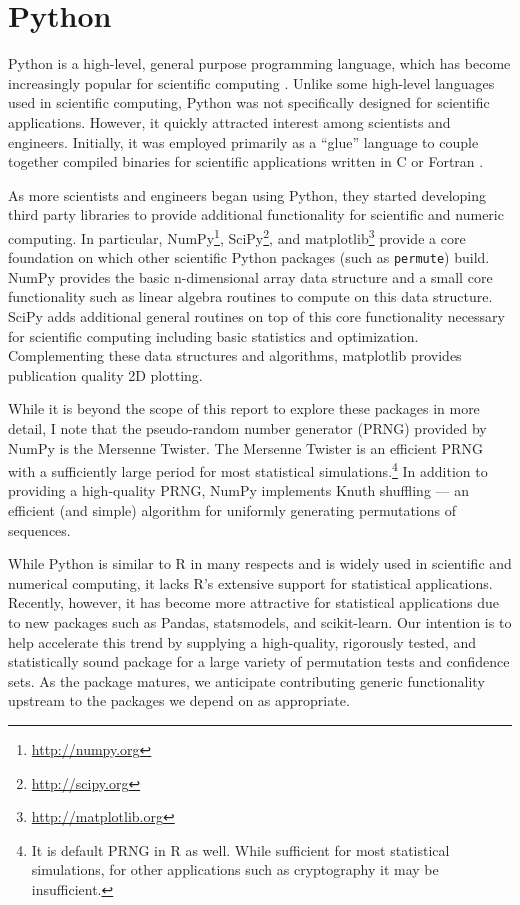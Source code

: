\section{Python}

Python is a high-level, general purpose programming language, which has become
increasingly popular for scientific computing \cite{millman2011python,
Perez2011}. Unlike some high-level languages used in scientific computing,
Python was not specifically designed for scientific applications.  However, it
quickly attracted interest among scientists and engineers.  Initially, it was
employed primarily as a ``glue'' language to couple together compiled binaries
for scientific applications written in C or Fortran \cite{dubois2007guest}.

As more scientists and engineers began using Python, they started developing
third party libraries to provide additional functionality for scientific
and numeric computing.  In particular, NumPy\footnote{\url{http://numpy.org}},
SciPy\footnote{\url{http://scipy.org}}, and matplotlib\footnote{
\url{http://matplotlib.org}} provide a core foundation on which other
scientific Python packages (such as \texttt{permute}) build. NumPy
provides the basic n-dimensional array data structure and a small core
functionality such as linear algebra routines to compute on this
data structure.  SciPy adds additional general routines on top
of this core functionality necessary for scientific computing including
basic statistics and optimization.  Complementing these data structures
and algorithms, matplotlib provides publication quality 2D plotting.  

While it is beyond the scope of this report to explore these packages in more
detail, I note that the pseudo-random number generator (PRNG) provided by NumPy
is the Mersenne Twister.  The Mersenne Twister is an efficient PRNG with a
sufficiently large period for most statistical simulations.\footnote{It is
default PRNG in R as well.  While sufficient for most statistical simulations,
for other applications such as cryptography it may be insufficient.}  In
addition to providing a high-quality PRNG, NumPy implements Knuth shuffling ---
an efficient (and simple) algorithm for uniformly generating permutations of
sequences.

While Python is similar to R in many respects and is widely used in scientific
and numerical computing, it lacks R's extensive support for statistical
applications.  Recently, however, it has become more attractive for statistical
applications due to new packages such as Pandas, statsmodels, and
scikit-learn.  Our intention is to help accelerate this trend by supplying a
high-quality, rigorously tested, and statistically sound package for a large
variety of permutation tests and confidence sets. As the package matures, we
anticipate contributing generic functionality upstream to the packages we
depend on as appropriate.
